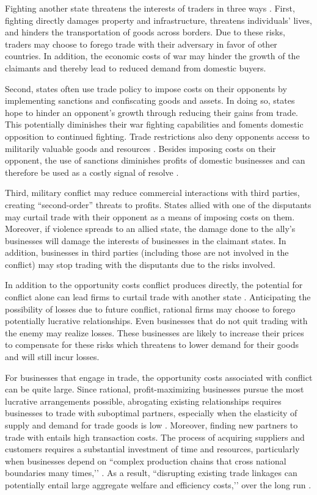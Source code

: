 Fighting another state threatens the interests of traders in three ways \citep{anderton2001, glick2010, keshk2004, kim2005, long2008, polachek1980}. First, fighting directly damages property and infrastructure, threatens individuals’ lives, and hinders the transportation of goods across borders. Due to these risks, traders may choose to forego trade with their adversary in favor of other countries. In addition, the economic costs of war may hinder the growth of the claimants and thereby lead to reduced demand from domestic buyers.

Second, states often use trade policy to impose costs on their opponents by implementing sanctions and confiscating goods and assets. In doing so, states hope to hinder an opponent’s growth through reducing their gains from trade. This potentially diminishes their war fighting capabilities and foments domestic opposition to continued fighting. Trade restrictions also deny opponents access to militarily valuable goods and resources \citep{gowa1994}. Besides imposing costs on their opponent, the use of sanctions diminishes profits of domestic businesses and can therefore be used as a costly signal of resolve \citep{gartzke2001, morrow1999a}.

Third, military conflict may reduce commercial interactions with third parties, creating ``second-order'' threats to profits. States allied with one of the disputants may curtail trade with their opponent as a means of imposing costs on them. Moreover, if violence spreads to an allied state, the damage done to the ally’s businesses will damage the interests of businesses in the claimant states. In addition, businesses in third parties (including those are not involved in the conflict) may stop trading with the disputants due to the risks involved.

In addition to the opportunity costs conflict produces directly, the potential for conflict alone can lead firms to curtail trade with another state \citep{li2002, long2008, morrow1998, morrow1999a}. Anticipating the possibility of losses due to future conflict, rational firms may choose to forego potentially lucrative relationships. Even businesses that do not quit trading with the enemy may realize losses. These businesses are likely to increase their prices to compensate for these risks which threatens to lower demand for their goods and will still incur losses. 

For businesses that engage in trade, the opportunity costs associated with conflict can be quite large. Since rational, profit-maximizing businesses pursue the most lucrative arrangements possible, abrogating existing relationships requires businesses to trade with suboptimal partners, especially when the elasticity of supply and demand for trade goods is low \citep{polachek1992}. Moreover, finding new partners to trade with entails high transaction costs. The process of acquiring suppliers and customers requires a substantial investment of time and resources, particularly when businesses depend on ``complex production chains that cross national boundaries many times,’’ \citep[][29]{chaney2013}. As a result, ``disrupting existing trade linkages can potentially entail large aggregate welfare and efficiency costs,’’ over the long run \citep[][28]{chaney2013}. 

